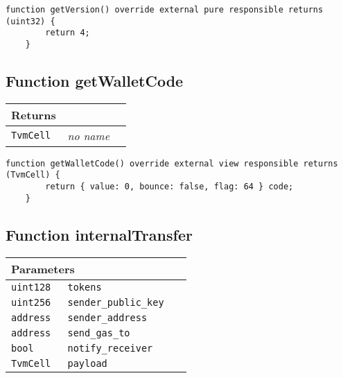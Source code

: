 \vspace{2cm}

\begin{lstlisting}[firstnumber=54]
    function getVersion() override external pure responsible returns (uint32) {
        return 4;
    }
\end{lstlisting}

\subsection{Function getWalletCode}


\ifsoltables
\noindent\begin{tabular}{|l|l|p{5cm}|}\hline
\multicolumn{3}{|l|}{\bf Returns}\\\hline
\tt TvmCell & {\em no name} &\\\hline
\end{tabular}
\fi

\vspace{2cm}

\begin{lstlisting}[firstnumber=87]
    function getWalletCode() override external view responsible returns (TvmCell) {
        return { value: 0, bounce: false, flag: 64 } code;
    }
\end{lstlisting}

\subsection{Function internalTransfer}


\ifsoltables
\noindent\begin{tabular}{|l|l|p{5cm}|}\hline
\multicolumn{3}{|l|}{\bf Parameters}\\\hline
\tt uint128 & \tt tokens &\\\hline
\tt uint256 & \tt sender\_{}public\_{}key &\\\hline
\tt address & \tt sender\_{}address &\\\hline
\tt address & \tt send\_{}gas\_{}to &\\\hline
\tt bool & \tt notify\_{}receiver &\\\hline
\tt TvmCell & \tt payload &\\\hline
\end{tabular}
\fi

\vspace{2cm}

